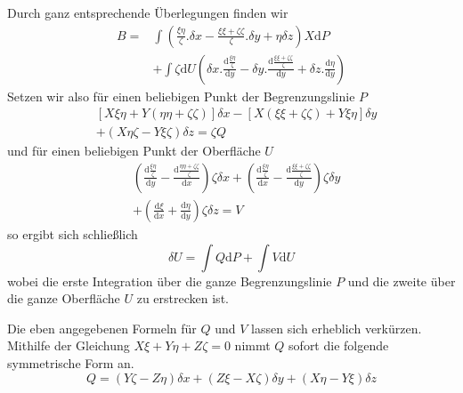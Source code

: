 Durch ganz entsprechende Überlegungen finden wir
\[
\begin{aligned}
B={}&\int(\frac{\xi\eta}{\zeta}.\delta x-\frac{\xi\xi+\zeta\zeta}{\zeta}.\delta y+\eta\delta z)X\mathrm{d}P\\
&+\int\zeta\mathrm{d}U(\delta x.\frac{\mathrm{d}\frac{\xi\eta}{\zeta}}{\mathrm{d}y}-\delta y.\frac{\mathrm{d}\frac{\xi\xi+\zeta\zeta}{\zeta}}{\mathrm{d}y}+\delta z.\frac{\mathrm{d}\eta}{\mathrm{d}y})
\end{aligned}
\]
Setzen wir also für einen beliebigen Punkt der Begrenzungslinie $P$
\[
\begin{aligned}
&[X\xi\eta+Y(\eta\eta+\zeta\zeta)]\delta x-[X(\xi\xi+\zeta\zeta)+Y\xi\eta]\delta y\\
&+(X\eta\zeta-Y\xi\zeta)\delta z=\zeta Q
\end{aligned}
\]
und für einen beliebigen Punkt der Oberfläche $U$
\[
\begin{aligned}
&(\frac{\mathrm{d}\frac{\xi\eta}{\zeta}}{\mathrm{d}y}-\frac{\mathrm{d}\frac{\eta\eta+\zeta\zeta}{\zeta}}{\mathrm{d}x})\zeta\delta x+(\frac{\mathrm{d}\frac{\xi\eta}{\zeta}}{\mathrm{d}x}-\frac{\mathrm{d}\frac{\xi\xi+\zeta\zeta}{\zeta}}{\mathrm{d}y})\zeta\delta y\\
&+(\frac{\mathrm{d}\xi}{\mathrm{d}x}+\frac{\mathrm{d}\eta}{\mathrm{d}y})\zeta\delta z=V
\end{aligned}
\]
so ergibt sich schließlich
\[
\delta U=\int Q\mathrm{d}P+\int V\mathrm{d}U
\]
wobei die erste Integration über die ganze Begrenzungslinie $P$ und die zweite über die ganze Oberfläche $U$ zu erstrecken ist.

Die eben angegebenen Formeln für $Q$ und $V$ lassen sich erheblich verkürzen. Mithilfe der Gleichung $X\xi+Y\eta+Z\zeta=0$ nimmt $Q$ sofort die folgende symmetrische Form an.
\[
Q=(Y\zeta-Z\eta)\delta x+(Z\xi-X\zeta)\delta y+(X\eta-Y\xi)\delta z
\]

